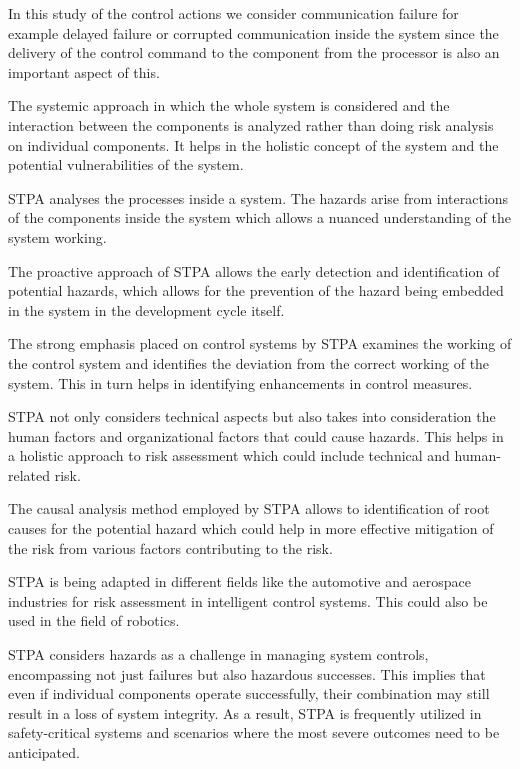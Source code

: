 {In this study of the control actions we consider communication failure for example delayed failure or corrupted communication inside the system since the delivery of the control command to the component from the processor is also an important aspect of this.



The systemic approach in which the whole system is considered and the interaction between the components is analyzed rather than doing risk analysis on individual components. It helps in the holistic concept of the system and the potential vulnerabilities of the system.

STPA analyses the processes inside a system. The hazards arise from interactions of the components inside the system which allows a nuanced understanding of the system working.

The proactive approach of STPA allows the early detection and identification of potential hazards, which allows for the prevention of the hazard being embedded in the system in the development cycle itself.

The strong emphasis placed on control systems by STPA examines the working of the control system and identifies the deviation from the correct working of the system. This in turn helps in identifying enhancements in control measures.

STPA not only considers technical aspects but also takes into consideration the human factors and organizational factors that could cause hazards. This helps in a holistic approach to risk assessment which could include technical and human-related risk.


The causal analysis method employed by STPA allows to identification of root causes for the potential hazard which could help in more effective mitigation of the risk from various factors contributing to the risk.

STPA is being adapted in different fields like the automotive and aerospace industries for risk assessment in intelligent control systems. This could also be used in the field of robotics.

STPA considers hazards as a challenge in managing system controls, encompassing not just failures but also hazardous successes. This implies that even if individual components operate successfully, their combination may still result in a loss of system integrity. As a result, STPA is frequently utilized in safety-critical systems and scenarios where the most severe outcomes need to be anticipated.

}
